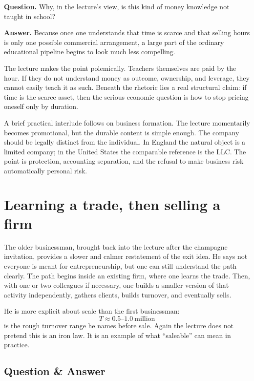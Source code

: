 \textbf{Question.} Why, in the lecture's view, is this kind of money knowledge not taught in school?

\textbf{Answer.} Because once one understands that time is scarce and that selling hours is only one possible commercial arrangement, a large part of the ordinary educational pipeline begins to look much less compelling.

The lecture makes the point polemically. Teachers themselves are paid by the hour. If they do not understand money as outcome, ownership, and leverage, they cannot easily teach it as such. Beneath the rhetoric lies a real structural claim: if time is the scarce asset, then the serious economic question is how to stop pricing oneself only by duration.

A brief practical interlude follows on business formation. The lecture momentarily becomes promotional, but the durable content is simple enough. The company should be legally distinct from the individual. In England the natural object is a limited company; in the United States the comparable reference is the LLC. The point is protection, accounting separation, and the refusal to make business risk automatically personal risk.

\section{Learning a trade, then selling a firm}

The older businessman, brought back into the lecture after the champagne invitation, provides a slower and calmer restatement of the exit idea. He says not everyone is meant for entrepreneurship, but one can still understand the path clearly. The path begins inside an existing firm, where one learns the trade. Then, with one or two colleagues if necessary, one builds a smaller version of that activity independently, gathers clients, builds turnover, and eventually sells.

He is more explicit about scale than the first businessman:
\begin{equation}
T \approx 0.5\text{--}1.0\ \text{million}
\end{equation}
is the rough turnover range he names before sale. Again the lecture does not pretend this is an iron law. It is an example of what ``saleable'' can mean in practice.

\subsection{Question \& Answer}

